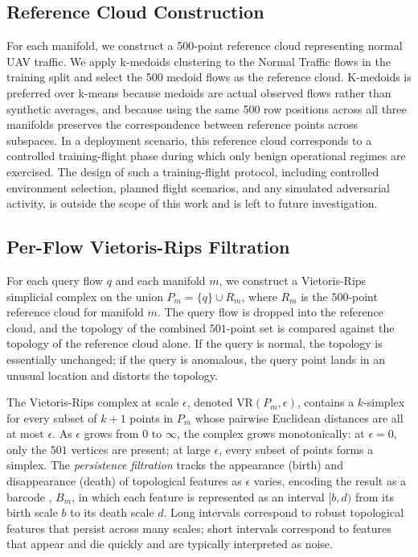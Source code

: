 \documentclass[conf]{new-aiaa}
\begin{document}
\subsection{Reference Cloud Construction}

For each manifold, we construct a 500-point reference cloud representing normal UAV traffic. We apply k-medoids clustering \cite{Kaufman} to the Normal Traffic flows in the training split and select the 500 medoid flows as the reference cloud. K-medoids is preferred over k-means because medoids are actual observed flows rather than synthetic averages, and because using the same 500 row positions across all three manifolds preserves the correspondence between reference points across subspaces. In a deployment scenario, this reference cloud corresponds to a controlled training-flight phase during which only benign operational regimes are exercised. The design of such a training-flight protocol, including controlled environment selection, planned flight scenarios, and any simulated adversarial activity, is outside the scope of this work and is left to future investigation.

\subsection{Per-Flow Vietoris-Rips Filtration}

For each query flow $q$ and each manifold $m$, we construct a Vietoris-Rips simplicial complex on the union $P_m = \{q\} \cup R_m$, where $R_m$ is the $500$-point reference cloud for manifold $m$. The query flow is dropped into the reference cloud, and the topology of the combined $501$-point set is compared against the topology of the reference cloud alone. If the query is normal, the topology is essentially unchanged; if the query is anomalous, the query point lands in an unusual location and distorts the topology.

The Vietoris-Rips complex at scale $\epsilon$, denoted $\text{VR}(P_m, \epsilon)$, contains a $k$-simplex for every subset of $k+1$ points in $P_m$ whose pairwise Euclidean distances are all at most $\epsilon$. As $\epsilon$ grows from $0$ to $\infty$, the complex grows monotonically: at $\epsilon = 0$, only the $501$ vertices are present; at large $\epsilon$, every subset of points forms a simplex. The \emph{persistence filtration} tracks the appearance (birth) and disappearance (death) of topological features as $\epsilon$ varies, encoding the result as a barcode \cite{Ghrist}, $B_m$, in which each feature is represented as an interval $[b, d)$ from its birth scale $b$ to its death scale $d$. Long intervals correspond to robust topological features that persist across many scales; short intervals correspond to features that appear and die quickly and are typically interpreted as noise.
\end{document}
